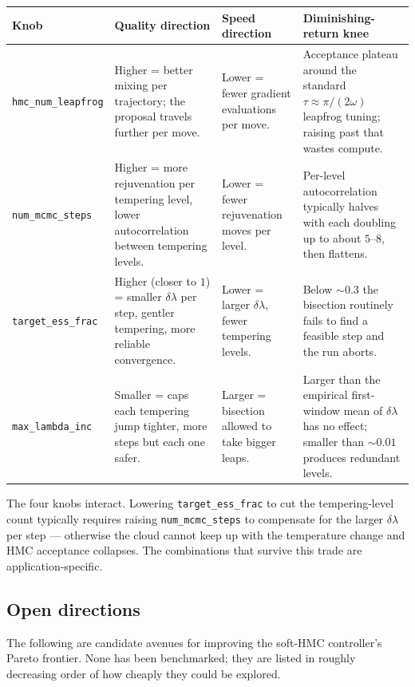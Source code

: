 \begin{center}\small
\begin{longtable}{lp{3.5cm}p{3.5cm}p{4cm}}
\toprule
Knob & Quality direction & Speed direction & Diminishing-return knee \\
\midrule
\endhead
\texttt{hmc\_num\_leapfrog} & Higher = better mixing per trajectory; the proposal travels further per move. & Lower = fewer gradient evaluations per move. & Acceptance plateau around the standard $\tau \approx \pi/(2\omega)$ leapfrog tuning; raising past that wastes compute. \\
\texttt{num\_mcmc\_steps}     & Higher = more rejuvenation per tempering level, lower autocorrelation between tempering levels. & Lower = fewer rejuvenation moves per level. & Per-level autocorrelation typically halves with each doubling up to about $5$--$8$, then flattens. \\
\texttt{target\_ess\_frac}    & Higher (closer to $1$) = smaller $\delta\lambda$ per step, gentler tempering, more reliable convergence. & Lower = larger $\delta\lambda$, fewer tempering levels. & Below $\sim 0.3$ the bisection routinely fails to find a feasible step and the run aborts. \\
\texttt{max\_lambda\_inc}     & Smaller = caps each tempering jump tighter, more steps but each one safer. & Larger = bisection allowed to take bigger leaps. & Larger than the empirical first-window mean of $\delta\lambda$ has no effect; smaller than $\sim 0.01$ produces redundant levels. \\
\bottomrule
\end{longtable}
\end{center}

The four knobs interact. Lowering \texttt{target\_ess\_frac} to cut
the tempering-level count typically requires raising
\texttt{num\_mcmc\_steps} to compensate for the larger $\delta\lambda$
per step --- otherwise the cloud cannot keep up with the temperature
change and HMC acceptance collapses. The combinations that survive
this trade are application-specific.

\subsection{Open directions} \label{sec:fw-directions}

The following are candidate avenues for improving the soft-HMC
controller's Pareto frontier. None has been benchmarked; they are
listed in roughly decreasing order of how cheaply they could be
explored.

